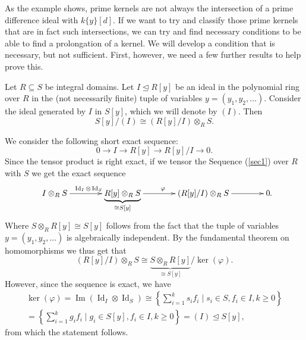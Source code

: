 As the example shows, prime kernels are not always the intersection of a prime difference ideal with $k\{y\}[d]$. 
If we want to try and classify those prime kernels that are in fact such intersections, we can try and find necessary conditions to be able to find a prolongation of a kernel. 
We will develop a condition that is necessary, but not sufficient. First, however, we need a few further results to help prove this.

\begin{lem}\label{lemtensor}
Let $R \subseteq S$ be integral domains. Let $I \unlhd R[y]$ be an ideal in the polynomial ring over $R$ in the (not necessarily finite) tuple of variables $y=(y_1,y_2,\ldots)$. Consider the ideal generated by $I$ in $S[y]$, which we will denote by $(I)$.
Then $$S[y]/(I) \cong (R[y]/I) \otimes_R S.$$

\begin{bew}
We consider the following short exact sequence:
\begin{equation}\label{sec1}
0 \rightarrow I \rightarrow R[y] \rightarrow R[y]/I \rightarrow 0.
\end{equation}
Since the tensor product is right exact, if we tensor the Sequence (\ref{sec1}) over $R$ with $S$ we get the exact sequence
\[
\begin{xy}
\xymatrixcolsep{3.2pc}
 \xymatrix{
I \otimes_R S \ar[r]^{\operatorname{Id}_I \otimes \operatorname{Id}_S} & \underbrace{ R[y] \otimes_R S}_{\cong S[y]} \ar[r]^\varphi & (R[y]/I) \otimes_R S  \ar[r] &  0 }
\end{xy}.
\]
Where $S \otimes_R R[y] \cong S[y]$ follows from the fact that the tuple of variables $y = (y_1,y_2,\ldots)$ is algebraically independent.  By the fundamental theorem on homomorphisms we thus get that $$(R[y]/I) \otimes_R S \cong \underbrace{ S \otimes_R R[y]}_{\cong S[y]}/\ker(\varphi).$$
However, since the sequence is exact, we have
\begin{align*} \ker(\varphi) = \operatorname{Im}(\operatorname{Id}_I \otimes \operatorname{Id}_S) \cong \left\{ \sum_{i = 1}^k s_i f_i \mid s_i \in S, f_i \in I, k \geq 0 \right\} \\ =  \left\{ \sum_{i = 1}^k g_i f_i \mid g_i \in S[y], f_i \in I, k \geq 0 \right\} = (I) \unlhd S[y], \end{align*}
from which the statement follows.
\end{bew}

\end{lem}


